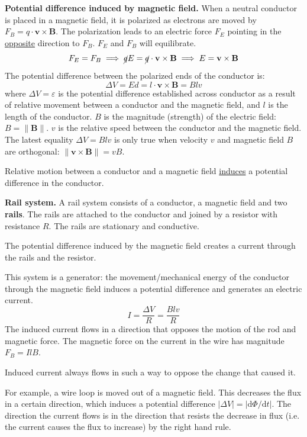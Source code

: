 \documentclass{article}
\newcommand{\theorem}[2]{\begin{tcolorbox}[title={#1},colback=blue!5!white,colframe=blue!75!black,parbox=false] #2 \end{tcolorbox}}
\newcommand{\example}[2]{\begin{tcolorbox}[title={Example: #1},colback=brown!5!white,colframe=brown!75!black,parbox=false] #2 \end{tcolorbox}}
\begin{document}
\textbf{Potential difference induced by magnetic field.} When a neutral conductor is placed in a magnetic field, it is polarized as electrons are moved by $F_B=q\cdot \mathbf v\times\mathbf B$. The polarization leads to an electric force $F_E$ pointing in the \ul{opposite} direction to $F_B$. $F_E$ and $F_B$ will equilibrate.
\begin{equation*}
    F_E=F_B
	\implies \cancel q E=\cancel q\cdot\mathbf v\times\mathbf B
	\implies E=\mathbf v\times\mathbf B
\end{equation*}
The potential difference between the polarized ends of the conductor is:
\begin{equation*}
    \Delta V=Ed=l\cdot \mathbf v\times \mathbf B =Blv
\end{equation*}
where $\Delta V=\varepsilon$ is the potential difference established across conductor as a result of relative movement between a conductor and the magnetic field, and $l$ is the length of the conductor. $B$ is the magnitude (strength) of the electric field: $B=\lVert \mathbf B \rVert $. $v$ is the relative speed between the conductor and the magnetic field. The latest equality $\Delta V=Blv$ is only true when velocity $v$ and magnetic field $B$ are orthogonal: $\lVert \mathbf v\times\mathbf B\rVert=vB$.

Relative motion between a conductor and a magnetic field \ul{induces} a potential difference in the conductor.

\textbf{Rail system.} A rail system consists of a conductor, a magnetic field and two \textbf{rails}. The rails are attached to the conductor and joined by a resistor with resistance $R$. The rails are stationary and conductive.

The potential difference induced by the magnetic field creates a current through the rails and the resistor.

This system is a generator: the movement/mechanical energy of the conductor through the magnetic field induces a potential difference and generates an electric current.
\begin{equation*}
    I=\frac{\Delta V}{R}=\frac{Blv}{R}
\end{equation*}
The induced current flows in a direction that opposes the motion of the rod and magnetic force. The magnetic force on the current in the wire has magnitude $F_B=IlB$.

\theorem{Lenz's law}{
	Induced current always flows in such a way to oppose the change that caused it.
}

\example{Lenz's law}{
	For example, a wire loop is moved out of a magnetic field. This decreases the flux in a certain direction, which induces a potential difference $\left|\Delta V\right|=\left|\mathrm{d}\Phi/\mathrm{d}t\right|$. The direction the current flows is in the direction that resists the decrease in flux (i.e. the current causes the flux to increase) by the right hand rule.
}
\end{document}

